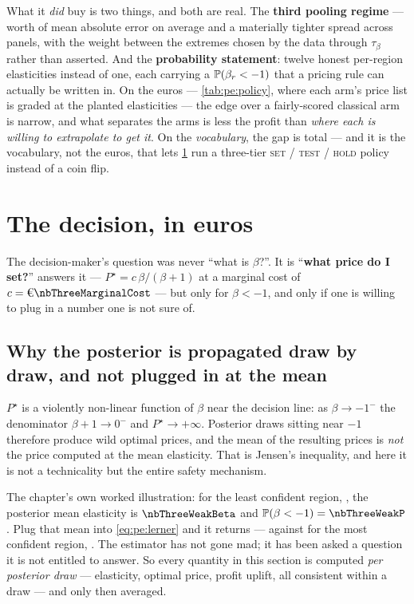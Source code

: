 What it \emph{did} buy is two things, and both are real. The \textbf{third pooling regime} --- worth
\pc{\nbThreeGainMean} of mean absolute error on average and a materially tighter spread across
panels, with the weight between the extremes chosen by the data through $\tau_\beta$ rather than
asserted. And the \textbf{probability statement}: twelve honest per-region elasticities instead of
one, each carrying a $\operatorname{\mathbb{P}}(\beta_r < -1)$ that a pricing rule can actually be written in. On the
euros --- \cref{tab:pe:policy}, where each arm's price list is graded at the planted elasticities ---
the edge over a fairly-scored classical arm is narrow, and what separates the arms is less the profit
than \emph{where each is willing to extrapolate to get it}. On the \emph{vocabulary}, the gap is
total --- and it is the vocabulary, not the euros, that lets \cref{sec:pe:euro} run a three-tier
\textsc{set} / \textsc{test} / \textsc{hold} policy instead of a coin flip.

\section{The decision, in euros}
\label{sec:pe:euro}

The decision-maker's question was never ``what is $\beta$?''. It is ``\textbf{what price do I
set?}''  answers it --- $P^\star = c\,\beta/(\beta+1)$ at a marginal cost of
$c = \eur{\nbThreeMarginalCost}$ --- but only for $\beta < -1$, and only if one is willing to plug
in a number one is not sure of.

\subsection*{Why the posterior is propagated draw by draw, and not plugged in at the mean}

$P^\star$ is a violently non-linear function of $\beta$ near the decision line: as
$\beta \to -1^{-}$ the denominator $\beta + 1 \to 0^{-}$ and $P^\star \to +\infty$. Posterior draws
sitting near $-1$ therefore produce wild optimal prices, and the mean of the resulting prices is
\emph{not} the price computed at the mean elasticity. That is Jensen's inequality, and here it is
not a technicality but the entire safety mechanism.

The chapter's own worked illustration: for the least confident region, \nbThreeWeakRegion, the
posterior mean elasticity is $\nbThreeWeakBeta$ and $\Prob(\beta < -1) = \nbThreeWeakP$. Plug that
mean into \cref{eq:pe:lerner} and it returns \eur{\nbThreeWeakPlug} --- against
\eur{\nbThreeStrongPstar} for the most confident region, \nbThreeStrongRegion. The estimator has
not gone mad; it has been asked a question it is not entitled to answer. So every quantity in this
section is computed \emph{per posterior draw} --- elasticity, optimal price, profit uplift, all
consistent within a draw --- and only then averaged.

